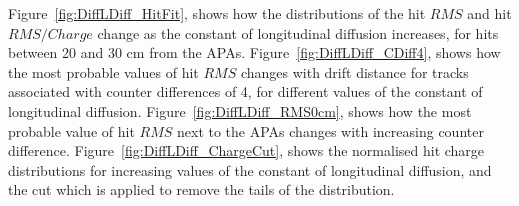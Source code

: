 Figure~\ref{fig:DiffLDiff_HitFit}, shows how the distributions of the hit $RMS$ and hit $RMS/Charge$ change as the constant of longitudinal diffusion increases, for hits between 20 and 30 cm from the APAs. Figure~\ref{fig:DiffLDiff_CDiff4}, shows how the most probable values of hit $RMS$ changes with drift distance for tracks associated with counter differences of 4, for different values of the constant of longitudinal diffusion. Figure~\ref{fig:DiffLDiff_RMS0cm}, shows how the most probable value of hit $RMS$ next to the APAs changes with increasing counter difference.  Figure~\ref{fig:DiffLDiff_ChargeCut}, shows the normalised hit charge distributions for increasing values of the constant of longitudinal diffusion, and the cut which is applied to remove the tails of the distribution. \\ 

